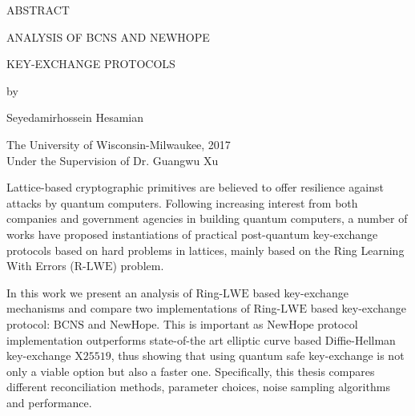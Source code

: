 \newcommand{\abstractTitleSize}{\normalsize}
{
	
\begin{center}
	\singlespacing
	
	{\abstractTitleSize \MakeUppercase{Abstract}}
	\vspace{0.7cm}
				
	{\abstractTitleSize \MakeUppercase{Analysis of BCNS and NewHope}}
				        
				        
	{\abstractTitleSize \MakeUppercase{Key-Exchange Protocols}}
				        
	\vspace{0.7cm}
				
	{\abstractTitleSize by}
				        
	\vspace{0.5cm}
				        
	{\abstractTitleSize Seyedamirhossein Hesamian}
				        
	\vspace{1cm}   
				    
	{\abstractTitleSize The University of Wisconsin-Milwaukee, 2017}\\
				
	{\abstractTitleSize Under the Supervision of Dr. Guangwu Xu}
				
	\vspace{0.5cm}
\end{center}
	

\doublespacing

\indent Lattice-based cryptographic primitives are believed to offer resilience against attacks by quantum computers. Following increasing interest from both companies and government agencies in building quantum computers, a number of works have proposed instantiations of practical post-quantum key-exchange protocols based on hard problems in lattices, mainly based on the Ring Learning With Errors (R-$\mathrm{LWE}$) problem.


In this work we present an analysis of Ring-$\mathrm{LWE}$ based key-exchange mechanisms and compare two implementations of Ring-$\mathrm{LWE}$ based key-exchange protocol: $\mathrm{BCNS}$ and $\mathrm{NewHope}$. This is important as $\mathrm{NewHope}$ protocol implementation outperforms state-of-the art elliptic curve based Diffie-Hellman key-exchange $\mathrm{X25519}$, thus showing that using quantum safe key-exchange is not only a viable option but also a faster one. Specifically, this thesis compares different reconciliation methods, parameter choices, noise sampling algorithms and performance.
	

		



}
\newpage
